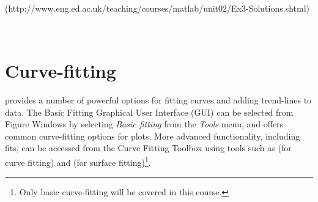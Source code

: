 {\begin{minipage}{\linewidth}
\begin{minipage}{6mm}
\end{minipage}
\href{http://www.eng.ed.ac.uk/teaching/courses/matlab/unit02/Ex3-Solutions.shtml}{}\\
(http://www.eng.ed.ac.uk/teaching/courses/matlab/unit02/Ex3-Solutions.shtml)
\end{minipage}%
}\\
\addtolength{\parindent}{4mm}

\section{Curve-fitting}
\mlab provides a number of powerful options for fitting curves and adding trend-lines to data. The Basic Fitting Graphical User Interface (GUI) can be selected from Figure Windows by selecting \textit{Basic fitting} from the \textit{Tools} menu, and offers common curve-fitting options for \twod plots. More advanced functionality, including \threed fits, can be accessed from the Curve Fitting Toolbox using tools such as  (for curve fitting) and  (for surface fitting)\footnote{Only basic curve-fitting will be covered in this course.}. \\

